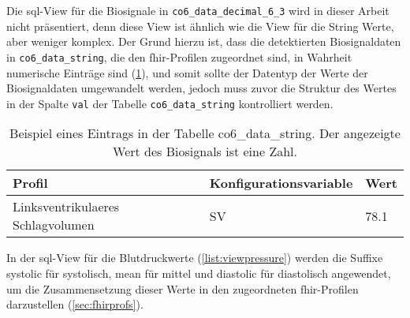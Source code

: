 Die \ac{sql}-View für die Biosignale in \texttt{co6\_data\_decimal\_6\_3} wird in dieser Arbeit nicht präsentiert, denn diese View ist ähnlich wie die View für die String Werte, aber weniger komplex. Der Grund hierzu ist, dass die detektierten Biosignaldaten in \texttt{co6\_data\_string}, die den \ac{fhir}-Profilen zugeordnet sind, in Wahrheit numerische Einträge sind (\ref{tab:stringvalue}), und somit sollte der Datentyp der Werte der Biosignaldaten umgewandelt werden, jedoch muss zuvor die Struktur des Wertes in der Spalte \texttt{val} der Tabelle \texttt{co6\_data\_string} kontrolliert werden.
\clearpage
\begin{table}[ht]
	\centering 
	\caption[Eintrag in der Tabelle co6\_data\_string]{Beispiel eines Eintrags in der Tabelle co6\_data\_string. Der angezeigte Wert des Biosignals ist eine Zahl.}
	\label{tab:stringvalue}
	\begin{tabular}{|l|l|l|}
		\hline
		\bfseries Profil & \bfseries Konfigurationsvariable & \bfseries Wert \\ \hline
		Linksventrikulaeres Schlagvolumen & SV & 78.1 \\ \hline
	\end{tabular}
\end{table}

In der \ac{sql}-View für die Blutdruckwerte (\ref{list:viewpressure}) werden die Suffixe \glqq systolic\grqq{} für systolisch, \glqq mean\grqq{} für mittel und \glqq diastolic\grqq{} für diastolisch angewendet, um die Zusammensetzung dieser Werte in den zugeordneten \ac{fhir}-Profilen darzustellen (\ref{sec:fhirprofs}). 

